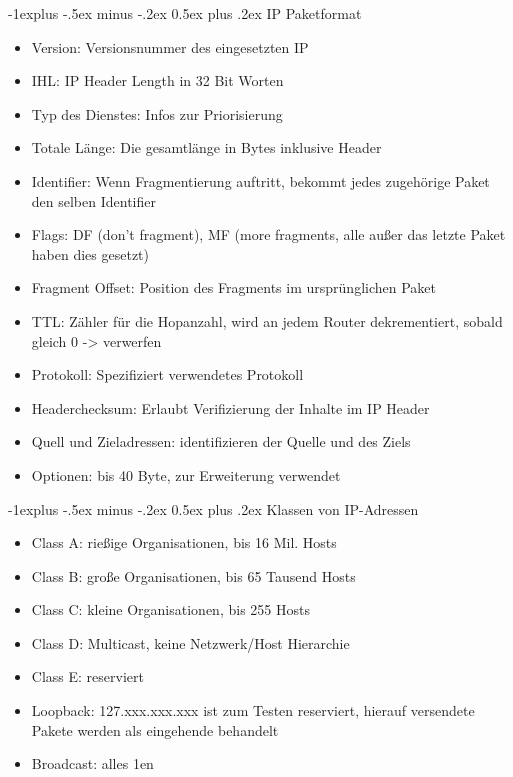 \documentclass[10pt,landscape]{article}
\makeatletter
\renewcommand{\subsection}{\@startsection{subsection}{2}{0mm}%
                                {-1explus -.5ex minus -.2ex}%
                                {0.5ex plus .2ex}%
                                {\normalfont\normalsize\bfseries}}
\makeatother
\begin{document}
\begin{multicols}{3}
\subsection{IP Paketformat}
\begin{itemize}
    \item Version: Versionsnummer des eingesetzten IP
    \item IHL: IP Header Length in 32 Bit Worten
    \item Typ des Dienstes: Infos zur Priorisierung
    \item Totale Länge: Die gesamtlänge in Bytes inklusive Header
    \item Identifier: Wenn Fragmentierung auftritt, bekommt jedes zugehörige Paket den selben Identifier
    \item Flags: DF (don't fragment), MF (more fragments, alle außer das letzte Paket haben dies gesetzt)
    \item Fragment Offset: Position des Fragments im ursprünglichen Paket
    \item TTL: Zähler für die Hopanzahl, wird an jedem Router dekrementiert, sobald gleich 0 -> verwerfen
    \item Protokoll: Spezifiziert verwendetes Protokoll
    \item Headerchecksum: Erlaubt Verifizierung der Inhalte im IP Header
    \item Quell und Zieladressen: identifizieren der Quelle und des Ziels
    \item Optionen: bis 40 Byte, zur Erweiterung verwendet
\end{itemize}

\subsection{Klassen von IP-Adressen}
\begin{itemize}
    \item Class A: rießige Organisationen, bis 16 Mil. Hosts
    \item Class B: große Organisationen, bis 65 Tausend Hosts
    \item Class C: kleine Organisationen, bis 255 Hosts
    \item Class D: Multicast, keine Netzwerk/Host Hierarchie
    \item Class E: reserviert
    \item Loopback: 127.xxx.xxx.xxx ist zum Testen reserviert, hierauf versendete Pakete werden als eingehende behandelt
    \item Broadcast: alles 1en
\end{itemize}


\end{multicols}
\end{document}
